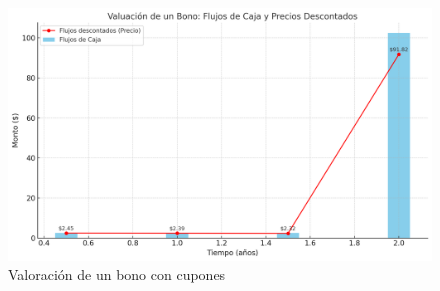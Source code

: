 \begin{frame}
    \begin{figure}[h]
       \centering
       \includegraphics[width=\textwidth]{img/cap1/bono_cupon.jpg}
       \caption{Valoración de un bono con cupones}
       \label{bono_cupon}
   \end{figure}
\end{frame}
